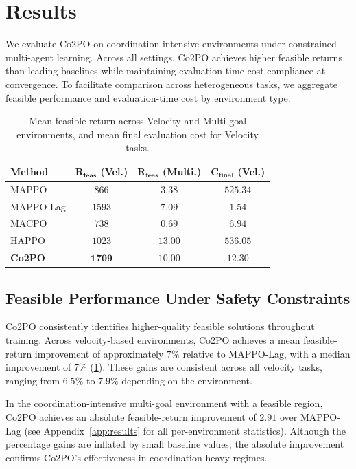\documentclass{article}
\theoremstyle{plain}
\theoremstyle{definition}
\theoremstyle{remark}
\begin{document}
\section{Results}
We evaluate Co2PO on coordination-intensive environments under constrained multi-agent learning. Across all settings, Co2PO achieves higher feasible returns than leading baselines while maintaining evaluation-time cost compliance at convergence. To facilitate comparison across heterogeneous tasks, we aggregate feasible performance and evaluation-time cost by environment type. 
\label{sec:results}
\begin{table}[h!]
\centering
\caption{Mean feasible return across Velocity and Multi-goal environments, and mean final evaluation cost for Velocity tasks.}
\label{tab:feasible_by_env_type}
\begin{small}
\setlength{\tabcolsep}{4pt}
\begin{tabular}{lccc}
\toprule
\textbf{Method} 
& $\boldsymbol{R_{\text{feas}}}$ (Vel.) 
& $\boldsymbol{R_{\text{feas}}}$ (Multi.) 
& $\boldsymbol{C_{\text{final}}}$ (Vel.) \\
\midrule
MAPPO 
& $866$ 
& $3.38$ 
& $525.34$ \\
MAPPO-Lag 
& $1593$ 
& $7.09$ 
& $1.54$ \\
MACPO 
& $738$ 
& $0.69$ 
& $6.94$ \\
HAPPO 
& $1023$ 
& $13.00$ 
& $536.05$ \\
\midrule
\textbf{Co2PO} 
& $\boldsymbol{1709}$ 
& $\boldsymbol{10.00}$ 
& $\boldsymbol{12.30}$ \\
\bottomrule
\end{tabular}
\end{small}
\end{table}



\subsection{Feasible Performance Under Safety Constraints}
\label{sec:feasible}
Co2PO consistently identifies higher-quality feasible solutions throughout training. 
Across velocity-based environments, Co2PO achieves a mean feasible-return improvement of approximately $7\%$ relative to MAPPO-Lag, with a median improvement of $7\%$ (\cref{tab:feasible_by_env_type}). 
These gains are consistent across all velocity tasks, ranging from $6.5\%$ to $7.9\%$ depending on the environment.

In the coordination-intensive multi-goal environment with a feasible region, Co2PO achieves an absolute feasible-return improvement of $2.91$ over MAPPO-Lag (see Appendix~\ref{app:results} for all per-environment statistics). Although the percentage gains are inflated by small baseline values, the absolute improvement confirms Co2PO’s effectiveness in coordination-heavy regimes.
\end{document}
